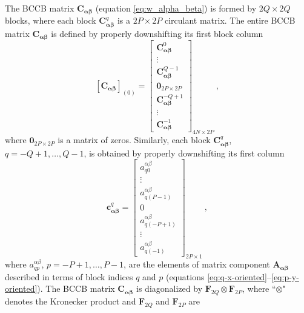 \documentclass[manuscript]{geophysics}
\begin{document}
	The BCCB matrix $\mathbf{C}_{\boldsymbol{\alpha\beta}}$ (equation \ref{eq:w_alpha_beta})
	is formed by $2Q \times 2Q$ blocks, 
	where each block $\mathbf{C}_{\boldsymbol{\alpha\beta}}^{q}$ is a $2P \times 2P$ circulant matrix.
	The entire BCCB matrix $\mathbf{C}_{\boldsymbol{\alpha\beta}}$ is defined by properly
	downshifting its first block column
	\begin{equation}
		\left[ \mathbf{C}_{\boldsymbol{\alpha\beta}} \right]_{(0)} = \begin{bmatrix}
			\mathbf{C}_{\boldsymbol{\alpha\beta}}^{0} \\
			\vdots \\
			\mathbf{C}_{\boldsymbol{\alpha\beta}}^{Q-1} \\
			\mathbf{0}_{2P \times 2P} \\
			\mathbf{C}_{\boldsymbol{\alpha\beta}}^{-Q+1} \\
			\vdots \\
			\mathbf{C}_{\boldsymbol{\alpha\beta}}^{-1}
		\end{bmatrix}_{4N \times 2P} \: ,
		\label{eq:C_alpha_beta_first_block_column}
	\end{equation}
	where $\mathbf{0}_{2P \times 2P}$ is a matrix of zeros. Similarly, 
	each block $\mathbf{C}_{\boldsymbol{\alpha\beta}}^{q}$, $q = -Q+1, \dots, Q-1$,
	is obtained by properly downshifting its first column
	\begin{equation}
		\mathbf{c}_{\boldsymbol{\alpha\beta}}^{q} = \begin{bmatrix}
			a^{\alpha\beta}_{q0} \\
			\vdots \\
			a^{\alpha\beta}_{q(P-1)} \\
			0 \\
			a^{\alpha\beta}_{q(-P+1)} \\
			\vdots \\
			a^{\alpha\beta}_{q(-1)}
		\end{bmatrix}_{2P \times 1} \: ,
		\label{eq:cq_alpha_beta}
	\end{equation}
	where $a^{\alpha\beta}_{qp}$, $p = -P+1, \dots, P-1$, are the elements of
	matrix component $\mathbf{A_{\boldsymbol{\alpha\beta}}}$ described in terms of
	block indices $q$ and $p$ (equations \ref{eq:q-x-oriented}--\ref{eq:p-y-oriented}). 
	The BCCB matrix $\mathbf{C}_{\boldsymbol{\alpha\beta}}$ is diagonalized by
	$\mathbf{F}_{2Q} \otimes \mathbf{F}_{2P}$, where ``$\otimes$" denotes the Kronecker product
	\citep[e.g.,][ p. 242]{horn_johnson1991} and $\mathbf{F}_{2Q}$ and $\mathbf{F}_{2P}$ are 
\end{document}
